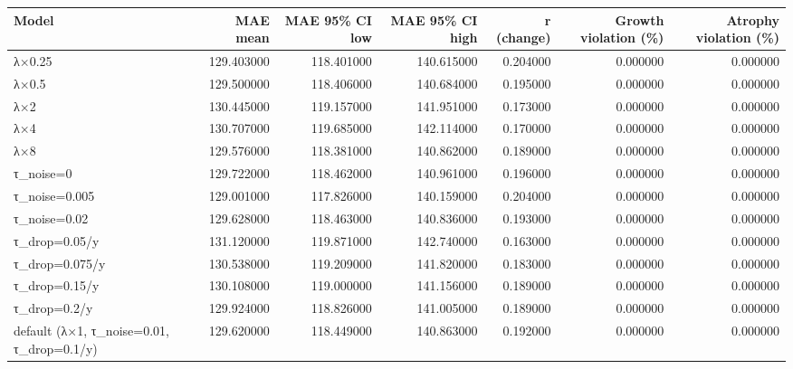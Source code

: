 \begin{tabular}{lrrrrrr}
\toprule
Model & MAE mean & MAE 95\% CI low & MAE 95\% CI high & r (change) & Growth violation (\%) & Atrophy violation (\%) \\
\midrule
λ×0.25 & 129.403000 & 118.401000 & 140.615000 & 0.204000 & 0.000000 & 0.000000 \\
λ×0.5 & 129.500000 & 118.406000 & 140.684000 & 0.195000 & 0.000000 & 0.000000 \\
λ×2 & 130.445000 & 119.157000 & 141.951000 & 0.173000 & 0.000000 & 0.000000 \\
λ×4 & 130.707000 & 119.685000 & 142.114000 & 0.170000 & 0.000000 & 0.000000 \\
λ×8 & 129.576000 & 118.381000 & 140.862000 & 0.189000 & 0.000000 & 0.000000 \\
τ\_noise=0 & 129.722000 & 118.462000 & 140.961000 & 0.196000 & 0.000000 & 0.000000 \\
τ\_noise=0.005 & 129.001000 & 117.826000 & 140.159000 & 0.204000 & 0.000000 & 0.000000 \\
τ\_noise=0.02 & 129.628000 & 118.463000 & 140.836000 & 0.193000 & 0.000000 & 0.000000 \\
τ\_drop=0.05/y & 131.120000 & 119.871000 & 142.740000 & 0.163000 & 0.000000 & 0.000000 \\
τ\_drop=0.075/y & 130.538000 & 119.209000 & 141.820000 & 0.183000 & 0.000000 & 0.000000 \\
τ\_drop=0.15/y & 130.108000 & 119.000000 & 141.156000 & 0.189000 & 0.000000 & 0.000000 \\
τ\_drop=0.2/y & 129.924000 & 118.826000 & 141.005000 & 0.189000 & 0.000000 & 0.000000 \\
default (λ×1, τ\_noise=0.01, τ\_drop=0.1/y) & 129.620000 & 118.449000 & 140.863000 & 0.192000 & 0.000000 & 0.000000 \\
\bottomrule
\end{tabular}
